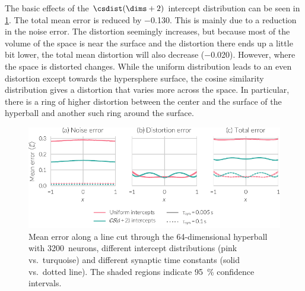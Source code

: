 The basic effects of the $\csdist(\dims + 2)$ intercept distribution can be seen in \cref{fig:error-cs-intercepts}.
The total mean error is reduced by \num{-0.130}.
This is mainly due to a reduction in the noise error.
The distortion seemingly increases, but because most of the volume of the space is near the surface and the distortion there ends up a little bit lower, the total mean distortion will also decrease (\num{-0.020}).
However, where the space is distorted changes.
While the uniform distribution leads to an even distortion except towards the hypersphere surface, the cosine similarity distribution gives a distortion that varies more across the space.
In particular, there is a ring of higher distortion between the center and the surface of the hyperball and another such ring around the surface.
\begin{figure}
    \centering
    \includegraphics{figures/error-cs-intercepts}
    \caption[Mean error along line cut with different intercept distributions]{Mean error along a line cut through the 64-dimensional hyperball with \num{3200}~neurons, different intercept distributions (pink vs.\ turquoise) and different synaptic time constants (solid vs.\ dotted line). The shaded regions indicate \SI{95}{\percent} confidence intervals.}\label{fig:error-cs-intercepts}
\end{figure}

